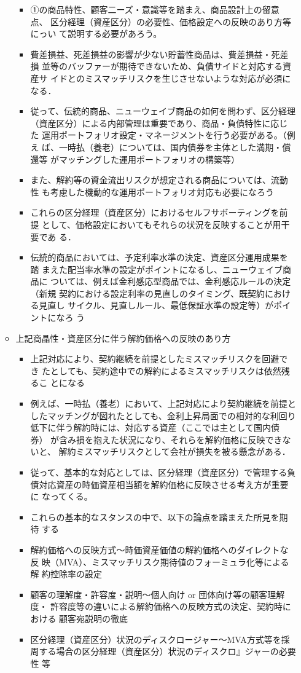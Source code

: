 \documentclass[report,gutter=10mm,fore-edge=10mm,uplatex,dvipdfmx]{jlreq}
\begin{document}
\begin{enumerate}
\begin{itemize}
\begin{itemize}
 \item ①の商品特性、顧客二ーズ・意識等を踏まえ、商品設計上の留意点、
区分経理（資産区分）の必要性、価格設定への反映のあり方等にっい
て説明する必要があろう。
 \item 費差損益、死差損益の影響が少ない貯蓄性商品は、費差損益・死差損
並等のバッファーが期待できないため、負債サイドと対応する資産サ
イドとのミスマッチリスクを生じさせないような対応が必須になる．
 \item 従って、伝統的商品、ニューウェイブ商品の如何を問わず、区分経理
（資産区分）による内部管理は重要であり、商品・負債特性に応じた
運用ポートフォリオ設定・マネージメントを行う必要がある。（例え
ば、一時払（養老）については、国内債券を主体とした満期・償還等
がマッチングした運用ポートフォリオの構築等）
 \item また、解約等の資金流出リスクが想定される商品については、流動性
も考慮した機動的な運用ポートフォリオ対応も必要になろう
 \item これらの区分経理（資産区分）におけるセルフサボーティングを前提
として、価格設定においてもそれらの状況を反映することが用干要であ
る．
 \item 伝統的商品においては、予定利率水準の決定、資産区分運用成果を踏
まえた配当率水準の設定がポイントになるし、ニューウェイブ商品に
ついては、例えば金利感応型商品では、金利感応ルールの決定（新規
契約における設定利率の見直しのタイミング、既契約における見直し
サイクル、見直しルール、最低保証水準の設定等）がポイントになろ
う
\end{itemize}
 \item 上記商晶性・資産区分に伴う解約価格への反映のあり方
\begin{itemize}
 \item 上記対応により、契約継続を前提としたミスマッチリスクを回避でき
たとしても、契約途中での解約によるミスマッチリスクは依然残るこ
とになる
 \item 例えば、一時払（養老）において、上記対応により契約継続を前提と
したマッチングが図れたとしても、金利上昇局面での相対的な利回り
低下に伴う解約時には、対応する資産（ここでは主として国内債券）
が含み損を抱えた状況になり、それらを解約価格に反映できないと、
解約ミスマッチリスクとして会社が損失を被る懸念がある．
 \item 従って、基本的な対応としては、区分経理（資産区分）で管理する負
債対応資産の時価資産相当額を解約価格に反映させる考え方が重要に
なってくる。
 \item これらの基本的なスタンスの中で、以下の論点を踏まえた所見を期待
する
 \item 解約価格への反映方式〜時価資産価値の解約価格へのダイレクトな反
映（MVA）、ミスマッチリスク期待値のフォーミュラ化等による解
約控除率の設定
 \item 顧客の理解度・許容度・説明〜個人向け or 団体向け等の顧客理解度・
許容度等の違いによる解約価格への反映方式の決定、契約時における
顧客宛説明の徹底
 \item 区分経理（資産区分）状況のディスクロージャー〜MVA方式等を採
周する場合の区分経理（資産区分）状況のディスクロ』ジャーの必要
性 等
\end{itemize}
\end{itemize}
\end{enumerate}
\end{document}
